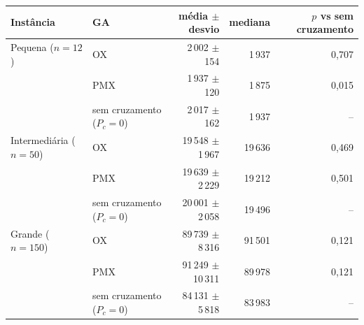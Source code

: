 \begin{tabular}{llrrr}
\toprule
Instância & GA & média $\pm$ desvio & mediana & $p$ vs sem cruzamento \\
\midrule
Pequena ($n=12$) & OX & 2\,002 $\pm$ 154 & 1\,937 & 0,707 \\
 & PMX & 1\,937 $\pm$ 120 & 1\,875 & 0,015 \\
 & sem cruzamento ($P_c=0$) & 2\,017 $\pm$ 162 & 1\,937 & -- \\
\midrule
Intermediária ($n=50$) & OX & 19\,548 $\pm$ 1\,967 & 19\,636 & 0,469 \\
 & PMX & 19\,639 $\pm$ 2\,229 & 19\,212 & 0,501 \\
 & sem cruzamento ($P_c=0$) & 20\,001 $\pm$ 2\,058 & 19\,496 & -- \\
\midrule
Grande ($n=150$) & OX & 89\,739 $\pm$ 8\,316 & 91\,501 & 0,121 \\
 & PMX & 91\,249 $\pm$ 10\,311 & 89\,978 & 0,121 \\
 & sem cruzamento ($P_c=0$) & 84\,131 $\pm$ 5\,818 & 83\,983 & -- \\
\bottomrule
\end{tabular}
